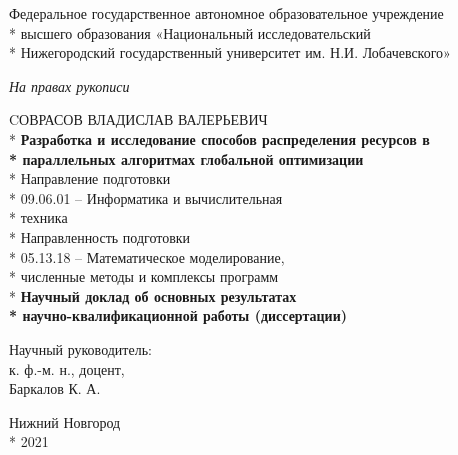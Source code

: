 \begin{titlepage}

\begin{center}
  \fontsize{14pt}{0pt}

  Федеральное государственное автономное образовательное учреждение \\*
  высшего образования «Национальный исследовательский \\*
  Нижегородский государственный университет им. Н.И. Лобачевского»\\
\end{center}

\vspace{12pt}
\vspace{25pt}

\begin{center}
\fontsize{14pt}{0pt}
\textit{На правах рукописи\\}

\vspace{12pt}

CОВРАСОВ ВЛАДИСЛАВ ВАЛЕРЬЕВИЧ\\*
\vspace{12pt}
\vspace{25pt}
\textbf{Разработка и исследование способов распределения ресурсов в\\*
параллельных алгоритмах глобальной оптимизации}\\*
\vspace{14pt}
Направление подготовки\\*
09.06.01 – Информатика и вычислительная\\*
техника\\*
\vspace{14pt}
Направленность подготовки\\*
05.13.18 – Математическое моделирование,\\*
численные методы и комплексы программ\\*
\vspace{14pt}
\vspace{14pt}
\textbf{Научный доклад об основных результатах\\*
научно-квалификационной работы (диссертации)}
\end{center}

\vspace{40pt}


\begin{flushright}
Научный руководитель:\\
к. ф.-м. н., доцент,\\
Баркалов К. А.\\
\end{flushright}

\vspace{30pt}

\vspace{\fill}

\begin{center}
Нижний Новгород \\*
2021
\end{center}

\end{titlepage}
